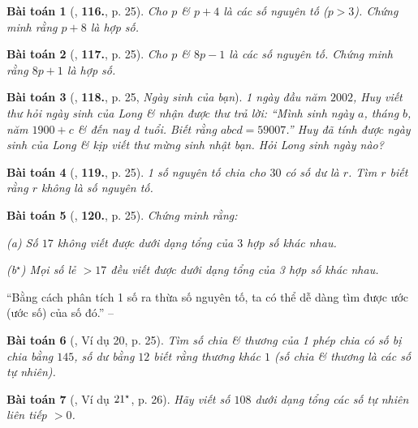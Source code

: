 \documentclass[oneside]{book}
\numberwithin{equation}{section}
\newtheorem{baitoan}{Bài toán}[section]
\begin{document}
\begin{baitoan}[\cite{Binh_Toan_6_tap_1}, \textbf{116.}, p. 25]
	Cho $p$ \& $p + 4$ là các số nguyên tố ($p > 3$). Chứng minh rằng $p + 8$ là hợp số.
\end{baitoan}

\begin{baitoan}[\cite{Binh_Toan_6_tap_1}, \textbf{117.}, p. 25]
	Cho $p$ \& $8p - 1$ là các số nguyên tố. Chứng minh rằng $8p + 1$ là hợp số.
\end{baitoan}

\begin{baitoan}[\cite{Binh_Toan_6_tap_1}, \textbf{118.}, p. 25, \textit{Ngày sinh của bạn}]
	1 ngày đầu năm $2002$, Huy viết thư hỏi ngày sinh của Long \& nhận được thư trả lời: ``Mình sinh ngày $a$, tháng $b$, năm $1900 + c$ \& đến nay $d$ tuổi. Biết rằng $abcd = 59007$.'' Huy đã tính được ngày sinh của Long \& kịp viết thư mừng sinh nhật bạn. Hỏi Long sinh ngày nào?
\end{baitoan}

\begin{baitoan}[\cite{Binh_Toan_6_tap_1}, \textbf{119.}, p. 25]
	1 số nguyên tố chia cho $30$ có số dư là $r$. Tìm $r$ biết rằng $r$ không là số nguyên tố.
\end{baitoan}

\begin{baitoan}[\cite{Binh_Toan_6_tap_1}, \textbf{120.}, p. 25]
	Chứng minh rằng:
	\begin{enumerate*}
		\item[(a)] Số $17$ không viết được dưới dạng tổng của $3$ hợp số khác nhau.
		\item[(b${}^\star$)] Mọi số lẻ $> 17$ đều viết được dưới dạng tổng của 3 hợp số khác nhau.
	\end{enumerate*}
\end{baitoan}
``Bằng cách phân tích 1 số ra thừa số nguyên tố, ta có thể dễ dàng tìm được ước (ước số) của số đó.'' -- \cite[\S6, p. 25]{Binh_Toan_6_tap_1}

\begin{baitoan}[\cite{Binh_Toan_6_tap_1}, Ví dụ 20, p. 25]
	Tìm số chia \& thương của 1 phép chia có số bị chia bằng $145$, số dư bằng $12$ biết rằng thương khác $1$ (số chia \& thương là các số tự nhiên).
\end{baitoan}

\begin{baitoan}[\cite{Binh_Toan_6_tap_1}, Ví dụ $\rm 21^\star$, p. 26]
	Hãy viết số $108$ dưới dạng tổng các số tự nhiên liên tiếp $> 0$.
\end{baitoan}
\end{document}
